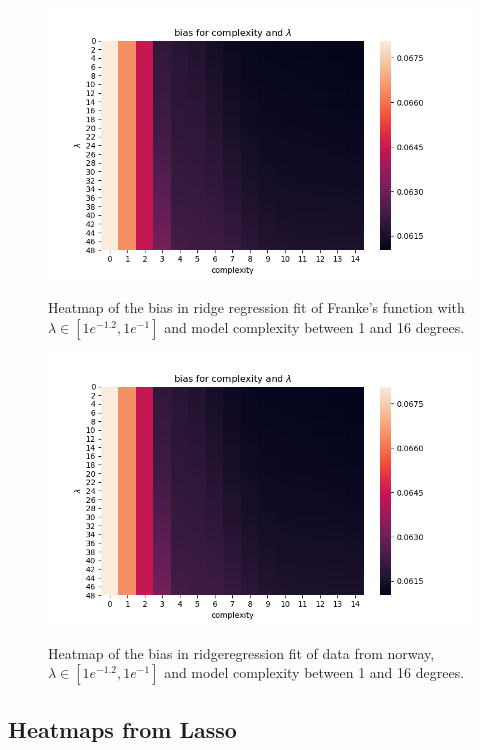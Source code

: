 \documentclass[ 12pt, a4paper ]{article}
\begin{document}
\begin{figure}[H]
\includegraphics[scale=0.7]{frankeridgebiasheatmap.png}
\label{fig:frankeridgebiasheatmap}
\caption{
    Heatmap of the bias in ridge regression fit of Franke's function with 
    $\lambda\in [1e^{-1.2}, 1e^{-1}]$ and model complexity between 1 and 16 degrees.
}
\end{figure}

\begin{figure}
\includegraphics[scale=0.7]{nordataridgebiasheatmap.png}
\label{fig:nordataridgebiasheatmap}
\caption{
    Heatmap of the bias in ridgeregression fit of data from norway, 
    $\lambda\in [1e^{-1.2}, 1e^{-1}]$ and  model complexity between 1 and 16 degrees.
}
\end{figure}

\subsection{Heatmaps from Lasso}
\end{document}
